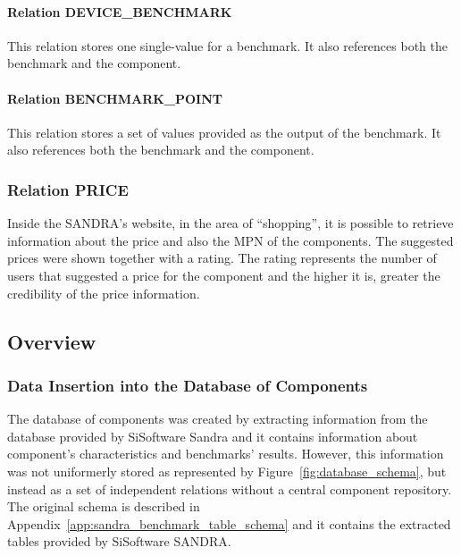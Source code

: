         \paragraph*{Relation DEVICE\_BENCHMARK}
            This relation stores one single-value for a benchmark. It also references both the benchmark and the component.
            
        \paragraph*{Relation BENCHMARK\_POINT}
            This relation stores a set of values provided as the output of the benchmark. It also references both the benchmark and the component.            

    \subsubsection*{Relation PRICE}
        Inside the SANDRA's website, in the area of ``shopping'', it is possible to retrieve information about the price and also the MPN of the components. The suggested prices were shown together with a rating. The rating represents the number of users that suggested a price for the component and the higher it is, greater the credibility of the price information.
                        
\subsection{Overview} \label{sec4:analysis_overview}
    \subsubsection*{Data Insertion into the Database of Components}
        The database of components was created by extracting information from the database provided by SiSoftware Sandra and it contains information about component's characteristics and benchmarks' results. However, this information was not uniformerly stored as represented by Figure~\ref{fig:database_schema}, but instead as a set of independent relations without a central component repository. The original schema is described in Appendix~\ref{app:sandra_benchmark_table_schema} and it contains the extracted tables provided by SiSoftware SANDRA.
    
